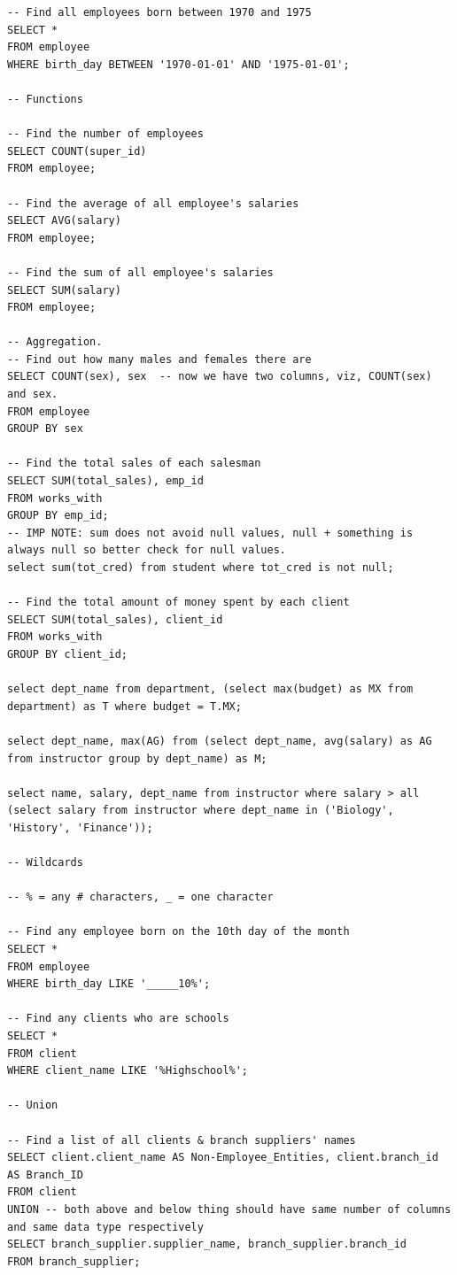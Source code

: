 \documentclass[8pt, a4paper, oneside, twocolumn]{extarticle}
\begin{document}
\begin{verbatim}
-- Find all employees born between 1970 and 1975
SELECT *
FROM employee
WHERE birth_day BETWEEN '1970-01-01' AND '1975-01-01';

-- Functions

-- Find the number of employees
SELECT COUNT(super_id)
FROM employee;

-- Find the average of all employee's salaries
SELECT AVG(salary)
FROM employee;

-- Find the sum of all employee's salaries
SELECT SUM(salary)
FROM employee;

-- Aggregation.
-- Find out how many males and females there are
SELECT COUNT(sex), sex  -- now we have two columns, viz, COUNT(sex) and sex.
FROM employee
GROUP BY sex

-- Find the total sales of each salesman
SELECT SUM(total_sales), emp_id
FROM works_with
GROUP BY emp_id;
-- IMP NOTE: sum does not avoid null values, null + something is always null so better check for null values.
select sum(tot_cred) from student where tot_cred is not null;

-- Find the total amount of money spent by each client
SELECT SUM(total_sales), client_id
FROM works_with
GROUP BY client_id;

select dept_name from department, (select max(budget) as MX from department) as T where budget = T.MX;

select dept_name, max(AG) from (select dept_name, avg(salary) as AG from instructor group by dept_name) as M;

select name, salary, dept_name from instructor where salary > all (select salary from instructor where dept_name in ('Biology', 'History', 'Finance'));

-- Wildcards

-- % = any # characters, _ = one character

-- Find any employee born on the 10th day of the month
SELECT *
FROM employee
WHERE birth_day LIKE '_____10%';

-- Find any clients who are schools
SELECT *
FROM client
WHERE client_name LIKE '%Highschool%';

-- Union

-- Find a list of all clients & branch suppliers' names
SELECT client.client_name AS Non-Employee_Entities, client.branch_id AS Branch_ID
FROM client
UNION -- both above and below thing should have same number of columns and same data type respectively
SELECT branch_supplier.supplier_name, branch_supplier.branch_id
FROM branch_supplier;


\end{verbatim}
\end{document}
